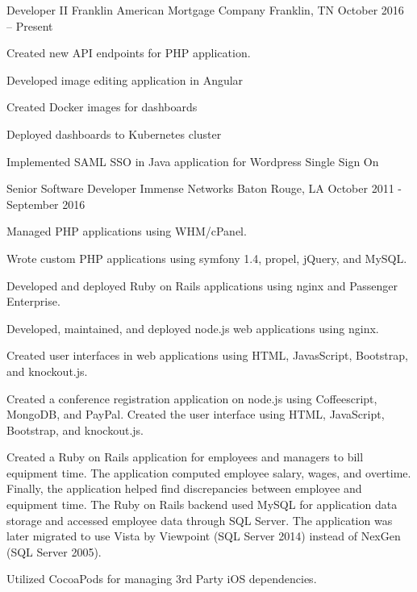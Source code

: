 \documentclass[]{awesome-cv}
\begin{document}
\vspace{-2mm}
\begin{cventries}
	\cventry
	{Developer II}
	{Franklin American Mortgage Company}
	{Franklin, TN}
	{October 2016 – Present}
	{\begin{cvitems}
		\item {Created new API endpoints for PHP application.}
		\item {Developed image editing application in Angular}
    \item {Created Docker images for dashboards}
    \item {Deployed dashboards to Kubernetes cluster}
    \item {Implemented SAML SSO in Java application for Wordpress Single Sign On}
		\end{cvitems}}
	\cventry
	{Senior Software Developer}
	{Immense Networks}
	{Baton Rouge, LA}
	{October 2011 - September 2016}
	{\begin{cvitems}
		\item {Managed PHP applications using WHM/cPanel.}
		\item {Wrote custom PHP applications using symfony 1.4, propel, jQuery, and MySQL.}
    \item {Developed and deployed Ruby on Rails applications using nginx and Passenger Enterprise.}
    \item {Developed, maintained, and deployed node.js web applications using nginx.}
    \item {Created user interfaces in web applications using HTML, JavasScript, Bootstrap, and knockout.js.}
    \item {Created a conference registration application on node.js using Coffeescript, MongoDB, and PayPal. Created the user interface using HTML, JavaScript, Bootstrap, and knockout.js.}
    \item {Created a Ruby on Rails application for employees and managers to bill equipment time. The application computed employee salary, wages, and overtime. Finally, the application helped find discrepancies between employee and equipment time. The Ruby on Rails backend used MySQL for application data storage and accessed employee data through SQL Server. The application was later migrated to use Vista by Viewpoint (SQL Server 2014) instead of NexGen (SQL Server 2005).}
    \item {Utilized CocoaPods for managing 3rd Party iOS dependencies.}

\end{cvitems}}
\end{cventries}
\end{document}
